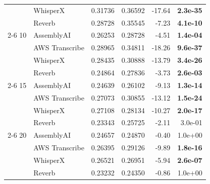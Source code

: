 \begin{tabular}{llrrrr}
  & WhisperX & 0.31736 & 0.36592 & -17.64 & \textbf{ 2.3e-35} \\
  & Reverb & 0.28728 & 0.35545 & -7.23 & \textbf{ 4.1e-10} \\
\cmidrule(r){2-6}
10 & AssemblyAI & 0.26253 & 0.28728 & -4.51 & \textbf{ 1.4e-04} \\
  & AWS Transcribe & 0.28965 & 0.34811 & -18.26 & \textbf{ 9.6e-37} \\
  & WhisperX & 0.28435 & 0.30888 & -13.79 & \textbf{ 3.4e-26} \\
  & Reverb & 0.24864 & 0.27836 & -3.73 & \textbf{ 2.6e-03} \\
\cmidrule(r){2-6}
15 & AssemblyAI & 0.24639 & 0.26102 & -9.13 & \textbf{ 1.3e-14} \\
  & AWS Transcribe & 0.27073 & 0.30855 & -13.12 & \textbf{ 1.5e-24} \\
  & WhisperX & 0.27108 & 0.28134 & -10.27 & \textbf{ 2.0e-17} \\
  & Reverb & 0.23343 & 0.25725 & -2.11 &  3.0e-01 \\
\cmidrule(r){2-6}
20 & AssemblyAI & 0.24657 & 0.24870 & -0.40 &  1.0e+00 \\
  & AWS Transcribe & 0.26395 & 0.29126 & -9.89 & \textbf{ 1.8e-16} \\
  & WhisperX & 0.26521 & 0.26951 & -5.94 & \textbf{ 2.6e-07} \\
  & Reverb & 0.23232 & 0.24350 & -0.86 &  1.0e+00 \\
\bottomrule
\end{tabular}
